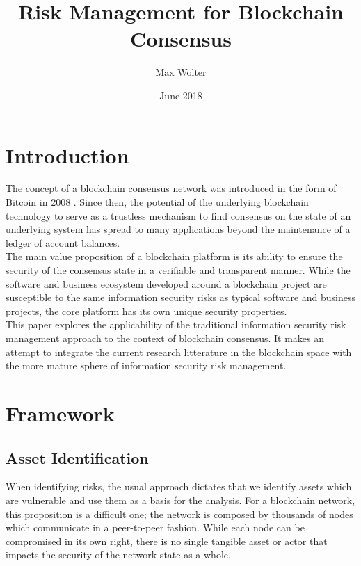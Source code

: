 \documentclass[11pt,a4paper,draft]{article}
\title{Risk Management for Blockchain Consensus}
\author{Max Wolter}
\date{June 2018}
\begin{document}
\maketitle
\begin{abstract}
\end{abstract}
\newpage

\tableofcontents
\newpage

\section{Introduction}

The concept of a blockchain consensus network was introduced in the form of Bitcoin in 2008 \cite{bitcoin}. Since then, the potential of the underlying blockchain technology to serve as a trustless mechanism to find consensus on the state of an underlying system has spread to many applications beyond the maintenance of a ledger of account balances.\\

The main value proposition of a blockchain platform is its ability to ensure the security of the consensus state in a verifiable and transparent manner. While the software and business ecosystem developed around a blockchain project are susceptible to the same information security risks as typical software and business projects, the core platform has its own unique security properties.\\

This paper explores the applicability of the traditional information security risk management approach to the context of blockchain consensus. It makes an attempt to integrate the current research litterature in the blockchain space with the more mature sphere of information security risk management.\\

\section{Framework}

\subsection{Asset Identification}

When identifying risks, the usual approach dictates that we identify assets which are vulnerable and use them as a basis for the analysis. For a blockchain network, this proposition is a difficult one; the network is composed by thousands of nodes which communicate in a peer-to-peer fashion. While each node can be compromised in its own right, there is no single tangible asset or actor that impacts the security of the network state as a whole.\\
\end{document}
